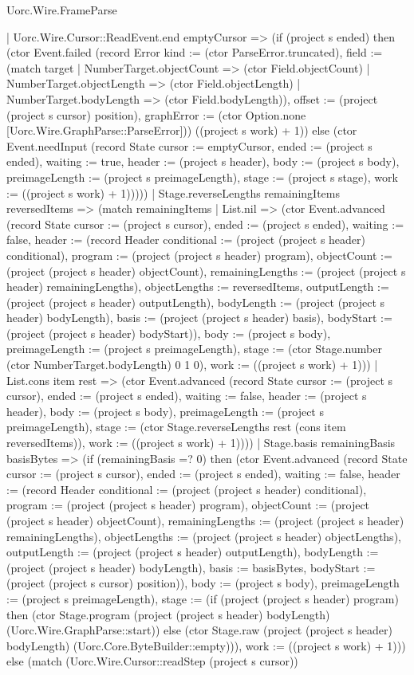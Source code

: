 \begin{lexlean}{Uorc.Wire.FrameParse}
\begin{semanticmodule}
{      | Uorc.Wire.Cursor::ReadEvent.end emptyCursor => (if (project s ended) then (ctor Event.failed (record Error {kind := (ctor ParseError.truncated), field := (match target
        | NumberTarget.objectCount => (ctor Field.objectCount)
        | NumberTarget.objectLength => (ctor Field.objectLength)
        | NumberTarget.bodyLength => (ctor Field.bodyLength)), offset := (project (project s cursor) position), graphError := (ctor Option.none [Uorc.Wire.GraphParse::ParseError])}) ((project s work) + 1)) else (ctor Event.needInput (record State {cursor := emptyCursor, ended := (project s ended), waiting := true, header := (project s header), body := (project s body), preimageLength := (project s preimageLength), stage := (project s stage), work := ((project s work) + 1)}))))
    | Stage.reverseLengths remainingItems reversedItems => (match remainingItems
      | List.nil => (ctor Event.advanced (record State {cursor := (project s cursor), ended := (project s ended), waiting := false, header := (record Header {conditional := (project (project s header) conditional), program := (project (project s header) program), objectCount := (project (project s header) objectCount), remainingLengths := (project (project s header) remainingLengths), objectLengths := reversedItems, outputLength := (project (project s header) outputLength), bodyLength := (project (project s header) bodyLength), basis := (project (project s header) basis), bodyStart := (project (project s header) bodyStart)}), body := (project s body), preimageLength := (project s preimageLength), stage := (ctor Stage.number (ctor NumberTarget.bodyLength) 0 1 0), work := ((project s work) + 1)}))
      | List.cons item rest => (ctor Event.advanced (record State {cursor := (project s cursor), ended := (project s ended), waiting := false, header := (project s header), body := (project s body), preimageLength := (project s preimageLength), stage := (ctor Stage.reverseLengths rest (cons item reversedItems)), work := ((project s work) + 1)})))
    | Stage.basis remainingBasis basisBytes => (if (remainingBasis =? 0) then (ctor Event.advanced (record State {cursor := (project s cursor), ended := (project s ended), waiting := false, header := (record Header {conditional := (project (project s header) conditional), program := (project (project s header) program), objectCount := (project (project s header) objectCount), remainingLengths := (project (project s header) remainingLengths), objectLengths := (project (project s header) objectLengths), outputLength := (project (project s header) outputLength), bodyLength := (project (project s header) bodyLength), basis := basisBytes, bodyStart := (project (project s cursor) position)}), body := (project s body), preimageLength := (project s preimageLength), stage := (if (project (project s header) program) then (ctor Stage.program (project (project s header) bodyLength) (Uorc.Wire.GraphParse::start)) else (ctor Stage.raw (project (project s header) bodyLength) (Uorc.Core.ByteBuilder::empty))), work := ((project s work) + 1)})) else (match (Uorc.Wire.Cursor::readStep (project s cursor))
}
\end{semanticmodule}
\end{lexlean}

